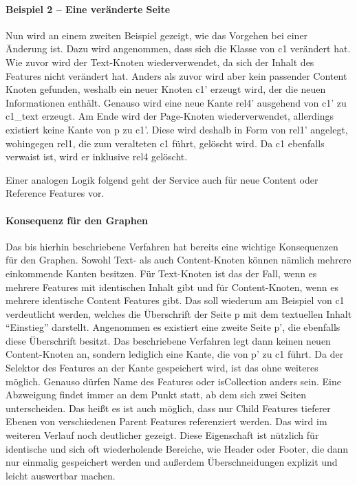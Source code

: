    \paragraph{Beispiel 2 -- Eine veränderte Seite}
    Nun wird an einem zweiten Beispiel gezeigt,
    wie das Vorgehen bei einer Änderung ist.
    Dazu wird angenommen, dass sich die Klasse von c1 verändert hat.
    Wie zuvor wird der Text-Knoten wiederverwendet,
    da sich der Inhalt des Features nicht verändert hat.
    Anders als zuvor wird aber kein passender Content Knoten gefunden,
    weshalb ein neuer Knoten c1' erzeugt wird, der die neuen Informationen enthält.
    Genauso wird eine neue Kante rel4' ausgehend von c1' zu c1\_text erzeugt.
    Am Ende wird der Page-Knoten wiederverwendet,
    allerdings existiert keine Kante von p zu c1'.
    Diese wird deshalb in Form von rel1' angelegt,
    wohingegen rel1, die zum veralteten c1 führt, gelöscht wird.
    Da c1 ebenfalls verwaist ist, wird er inklusive rel4 gelöscht.

    Einer analogen Logik folgend geht der Service auch für neue Content oder
    Reference Features vor.
    
    \paragraph{Konsequenz für den Graphen}
    Das bis hierhin beschriebene Verfahren hat bereits eine wichtige
    Konsequenzen für den Graphen.
    Sowohl Text- als auch Content-Knoten können nämlich mehrere einkommende Kanten besitzen.
    Für Text-Knoten ist das der Fall, wenn es mehrere Features mit identischen Inhalt gibt
    und für Content-Knoten, wenn es mehrere identische Content Features gibt.
    Das soll wiederum am Beispiel von c1 verdeutlicht werden,
    welches die Überschrift der Seite p mit dem textuellen Inhalt "`Einstieg"' darstellt.
    Angenommen es existiert eine zweite Seite p',
    die ebenfalls diese Überschrift besitzt.
    Das beschriebene Verfahren legt dann keinen neuen Content-Knoten an,
    sondern lediglich eine Kante, die von p' zu c1 führt.
    Da der Selektor des Features an der Kante gespeichert wird, ist das ohne weiteres möglich.
    Genauso dürfen Name des Features oder isCollection anders sein.
    Eine Abzweigung findet immer an dem Punkt statt,
    ab dem sich zwei Seiten unterscheiden.
    Das heißt es ist auch möglich, dass nur Child Features tieferer Ebenen
    von verschiedenen Parent Features referenziert werden.
    Das wird im weiteren Verlauf noch deutlicher gezeigt.    
    Diese Eigenschaft ist nützlich für identische und sich oft wiederholende Bereiche,
    wie Header oder Footer, die dann nur einmalig gespeichert werden und außerdem
    Überschneidungen explizit und leicht auswertbar machen.

